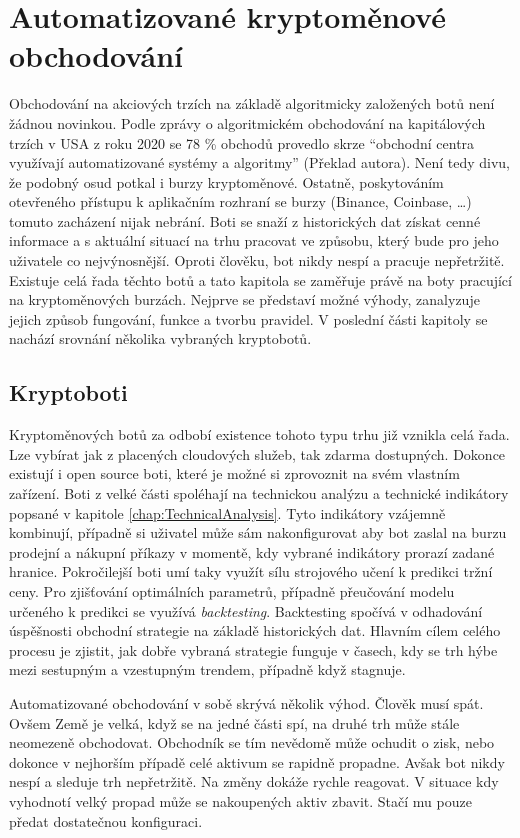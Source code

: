 \chapter{Automatizované kryptoměnové obchodování}
\label{chap:Cryptobots}
Obchodování na akciových trzích na základě algoritmicky založených botů není žádnou novinkou. Podle zprávy o algoritmickém obchodování na kapitálových trzích v USA z roku 2020
\cite{us-algorithmic-trading-report}
se 78 \% obchodů provedlo skrze \enquote{obchodní centra využívají automatizované systémy a algoritmy} (Překlad autora). Není tedy divu, že podobný osud potkal i burzy
kryptoměnové. Ostatně, poskytováním otevřeného přístupu k aplikačním rozhraní se burzy (Binance, Coinbase, \ldots) tomuto zacházení nijak nebrání. Boti se snaží z historických
dat získat cenné informace a s aktuální situací na trhu pracovat ve způsobu, který bude pro jeho uživatele co nejvýnosnější. Oproti člověku, bot nikdy nespí a pracuje
nepřetržitě. Existuje celá řada těchto botů a tato kapitola se zaměřuje právě na boty pracující na kryptoměnových burzách. Nejprve se představí možné výhody,
zanalyzuje jejich způsob fungování, funkce a tvorbu pravidel. V poslední části kapitoly se nachází srovnání několika vybraných kryptobotů.

\section{Kryptoboti}
Kryptoměnových botů za odbobí existence tohoto typu trhu již vznikla celá řada. Lze vybírat jak z placených cloudových služeb, tak zdarma dostupných. Dokonce existují i open
source boti, které je možné si zprovoznit na svém vlastním zařízení. Boti z velké části spoléhají na technickou analýzu a technické indikátory popsané v kapitole \ref{chap:TechnicalAnalysis}.
Tyto indikátory vzájemně kombinují, případně si uživatel může sám nakonfigurovat aby bot zaslal na burzu prodejní a nákupní příkazy v momentě, kdy vybrané indikátory
prorazí zadané hranice. Pokročilejší boti umí taky využít sílu strojového učení k predikci tržní ceny. Pro zjišťování optimálních parametrů, případně přeučování modelu
určeného k predikci se využívá \emph{backtesting}. Backtesting spočívá v odhadování úspěšnosti obchodní strategie na základě historických dat. Hlavním cílem celého procesu
je zjistit, jak dobře vybraná strategie funguje v časech, kdy se trh hýbe mezi sestupným a vzestupným trendem, případně když stagnuje.

Automatizované obchodování v sobě skrývá několik výhod. Člověk musí spát. Ovšem Země je velká, když se na jedné části spí, na druhé trh může stále neomezeně obchodovat.
Obchodník se tím nevědomě může ochudit o zisk, nebo dokonce v nejhorším případě celé aktivum se rapidně propadne. Avšak bot nikdy nespí a sleduje trh nepřetržitě. Na změny
dokáže rychle reagovat. V situace kdy vyhodnotí velký propad může se nakoupených aktiv zbavit. Stačí mu pouze předat dostatečnou konfiguraci.

